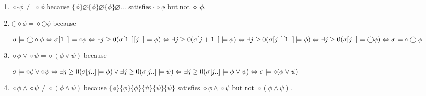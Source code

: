 \documentclass[12pt, a4paper]{article}
\begin{document}
\section{} %
\begin{enumerate}[a]
	\item %
	$\diamond \square \phi \neq \square \diamond \phi$ because $\{\phi\} \varnothing \{\phi\} \varnothing \{\phi\} \varnothing \dots$ satisfies $\square \diamond \phi$ but not $\diamond \square \phi$.
	\item %
	$\bigcirc \diamond \phi = \diamond \bigcirc \phi$ because

	$\sigma \models \bigcirc \diamond \phi\\
	\Leftrightarrow \sigma[1..] \models \diamond \phi\\
	\Leftrightarrow \exists j \geq 0 (\sigma[1..][j..] \models \phi)\\
	\Leftrightarrow \exists j \geq 0 (\sigma[j+1..] \models \phi)\\
	\Leftrightarrow \exists j \geq 0 (\sigma[j..][1..] \models \phi)\\
	\Leftrightarrow \exists j \geq 0 (\sigma[j..] \models \bigcirc \phi)\\
	\Leftrightarrow \sigma \models \diamond \bigcirc \phi$
	\item %
	$\diamond \phi \lor \diamond \psi = \diamond (\phi \lor \psi)$ because

	$\sigma \models \diamond \phi \lor \diamond \psi\\
	\Leftrightarrow \exists j \geq 0 (\sigma[j..] \models \phi) \lor \exists j \geq 0 (\sigma[j..] \models \psi)\\
	\Leftrightarrow \exists j \geq 0 (\sigma[j..] \models \phi \lor \psi)\\
	\Leftrightarrow \sigma \models \diamond (\phi \lor \psi)$
	\item %
	$\diamond \phi \land \diamond \psi \neq \diamond (\phi \land \psi)$ because $\{\phi\} \{\phi\} \{\phi\} \{\psi\} \{\psi\} \{\psi\}$ satisfies $\diamond \phi \land \diamond \psi$ but not $\diamond (\phi \land \psi)$.
\end{enumerate}
\end{document}
